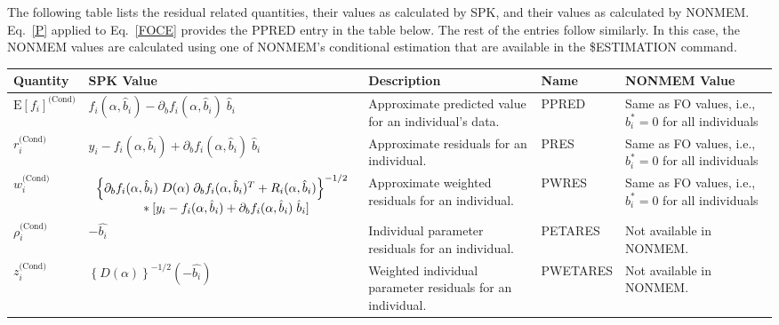 \documentclass{article}
\begin{document}
The following table lists the residual related quantities, their
values as calculated by SPK, and their values as calculated by NONMEM.
Eq.~\ref{P} applied to Eq.~\ref{FOCE} provides the PPRED entry in the table
below. The rest of the entries follow similarly.
In this case, the NONMEM values are calculated using 
one of NONMEM's conditional estimation that are available in the
\$ESTIMATION command.

\begin{center}
\begin{tabular}{|p{0.75in}|p{3.25in}|p{1.1in}|p{0.85in}|p{1.0in}|}
\hline
\hline
  {\bf Quantity}
    & {\bf SPK Value}
    & {\bf Description}
    & {\bf Name}
    & {\bf NONMEM Value} \\
  \hline
  \hline
  $\mbox{E} \left[ f_i \right]^{\mbox{(Cond)}}$
    & $f_i(\alpha, \hat{b}_i) - \partial_b f_i(\alpha, \hat{b}_i) \; \hat{b}_i$
    & Approximate predicted value for an individual's data.
    & PPRED 
    & Same as FO values, i.e., $b^{\ast}_i = 0$ for all individuals\\
  \hline
  $r^{\mbox{(Cond)}}_i$
    & $y_i - f_i(\alpha, \hat{b}_i) + \partial_b f_i(\alpha, \hat{b}_i) \; \hat{b}_i$
    & Approximate residuals for an individual.
    & PRES 
    & Same as FO values, i.e., $b^{\ast}_i = 0$ for all individuals\\
  \hline
  $w^{\mbox{(Cond)}}_i$
    & $\begin{array}{l}
        \left\{ \partial_b f_i(\alpha, \hat{b}_i) \;
          D(\alpha) \; \partial_b f_i(\alpha, \hat{b}_i)^T
          + R_i(\alpha, \hat{b}_i) \right\}^{-1/2} \\
        \mbox{\hspace{0.5in}}
        \ast [ y_i - f_i(\alpha, \hat{b}_i) 
           + \partial_b f_i(\alpha, \hat{b}_i) \; \hat{b}_i ]
      \end{array} $
    & Approximate weighted residuals for an individual.
    & PWRES 
    & Same as FO values, i.e., $b^{\ast}_i = 0$ for all individuals\\
  \hline
  $\rho^{\mbox{(Cond)}}_i$
    & $-\hat{b_i}$
    & Individual parameter residuals for an individual.
    & PETARES
    & Not available in NONMEM. \\
  \hline
  $z^{\mbox{(Cond)}}_i$
    & $\left\{ D(\alpha) \right\}^{-1/2} ( - \hat{b_i} )$
    & Weighted individual parameter residuals for an individual.
    & PWETARES
    & Not available in NONMEM. \\
  \hline
  \hline
\end{tabular}
\end{center}
\end{document}
